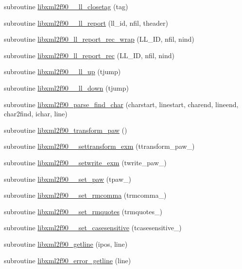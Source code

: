 \begin{DoxyCompactItemize}
subroutine \hyperlink{libxml2f90_8f90__pp_8f90_afd5fe490d70aae05e74fd17e87d31431}{libxml2f90\+\_\+\+\_\+ll\+\_\+closetag} (tag)
\item 
subroutine \hyperlink{libxml2f90_8f90__pp_8f90_a82abdf47d88bfca1f54ddd7fb0ca71f2}{libxml2f90\+\_\+\+\_\+ll\+\_\+report} (ll\+\_\+id, nfil, theader)
\item 
subroutine \hyperlink{libxml2f90_8f90__pp_8f90_aab03f23626a21bebdc849515ddbb2a84}{libxml2f90\+\_\+ll\+\_\+report\+\_\+rec\+\_\+wrap} (L\+L\+\_\+\+ID, nfil, nind)
\item 
subroutine \hyperlink{libxml2f90_8f90__pp_8f90_a5ddfde66a72fddf024606b83f50ecc3a}{libxml2f90\+\_\+ll\+\_\+report\+\_\+rec} (L\+L\+\_\+\+ID, nfil, nind)
\item 
subroutine \hyperlink{libxml2f90_8f90__pp_8f90_a4fdb16cf1b5c9a1b391a00dc270c835f}{libxml2f90\+\_\+\+\_\+ll\+\_\+up} (tjump)
\item 
subroutine \hyperlink{libxml2f90_8f90__pp_8f90_abe93b7544a083264c1c567ae64b7afa1}{libxml2f90\+\_\+\+\_\+ll\+\_\+down} (tjump)
\item 
subroutine \hyperlink{libxml2f90_8f90__pp_8f90_af6b4f4c6b9bd06993e7ab5cb607e7228}{libxml2f90\+\_\+parse\+\_\+find\+\_\+char} (charstart, linestart, charend, lineend, char2find, ichar, line)
\item 
subroutine \hyperlink{libxml2f90_8f90__pp_8f90_abf51b9d401b7210767c8a771a9ba2cf4}{libxml2f90\+\_\+transform\+\_\+paw} ()
\item 
subroutine \hyperlink{libxml2f90_8f90__pp_8f90_a2a5163c07b4567f5db11625bcdbb7607}{libxml2f90\+\_\+\+\_\+settransform\+\_\+exm} (ttransform\+\_\+paw\+\_\+)
\item 
subroutine \hyperlink{libxml2f90_8f90__pp_8f90_aa478c761a45bbb0eafdd081ea6cc0694}{libxml2f90\+\_\+\+\_\+setwrite\+\_\+exm} (twrite\+\_\+paw\+\_\+)
\item 
subroutine \hyperlink{libxml2f90_8f90__pp_8f90_ac3295351747cc53a1b37a87e4f99449d}{libxml2f90\+\_\+\+\_\+set\+\_\+paw} (tpaw\+\_\+)
\item 
subroutine \hyperlink{libxml2f90_8f90__pp_8f90_a853486e07f72af447dd5879e95f96c8d}{libxml2f90\+\_\+\+\_\+set\+\_\+rmcomma} (trmcomma\+\_\+)
\item 
subroutine \hyperlink{libxml2f90_8f90__pp_8f90_a88da78fbb7daa3d56763c5fe13fe2b35}{libxml2f90\+\_\+\+\_\+set\+\_\+rmquotes} (trmquotes\+\_\+)
\item 
subroutine \hyperlink{libxml2f90_8f90__pp_8f90_a97c04842d1625e96827c3d32280408ec}{libxml2f90\+\_\+\+\_\+set\+\_\+casesensitive} (tcasesensitive\+\_\+)
\item 
subroutine \hyperlink{libxml2f90_8f90__pp_8f90_abef5a4be7710d60ad11aab5a59fe5325}{libxml2f90\+\_\+getline} (ipos, line)
\item 
subroutine \hyperlink{libxml2f90_8f90__pp_8f90_ae1a542a061a5705a796b5373b0dcaf1b}{libxml2f90\+\_\+error\+\_\+getline} (line)
\end{DoxyCompactItemize}
